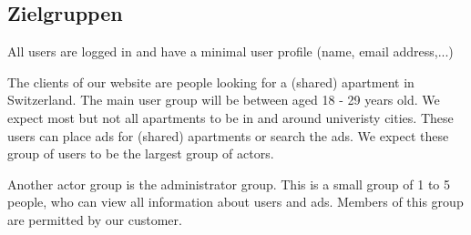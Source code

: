 \documentclass[a4wide]{article}
\begin{document}

\subsection{Zielgruppen}
All users are logged in and have a minimal user profile (name, email address,...)

The clients of our website are people looking for a (shared) apartment in Switzerland.
The main user group will be between aged 18 - 29 years old. 
We expect most but not all apartments to be in and around univeristy cities.
These users can place ads for (shared) apartments or search the ads. 
We expect these group of users to be the largest group of actors.

Another actor group is the administrator group. This is a small group of 1 to 5 people, who can view all information about users and ads. Members of this group are permitted by our customer. 
\end{document}

